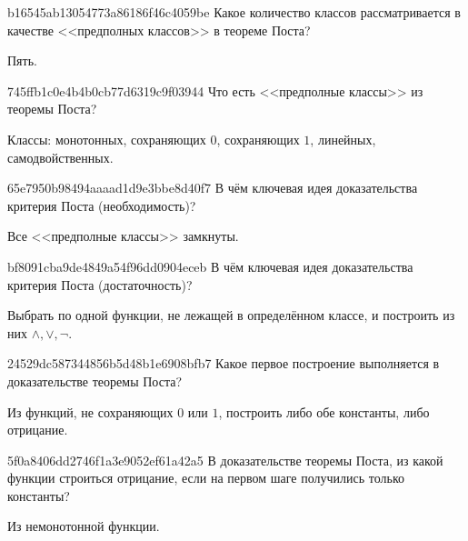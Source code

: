 \begin{note}{b16545ab13054773a86186f46c4059be}
    Какое количество классов рассматривается в качестве  <<предполных классов>> в теореме Поста?

    \begin{cloze}{1}
        Пять.
    \end{cloze}
\end{note}

\begin{note}{745ffb1c0e4b4b0cb77d6319c9f03944}
    Что есть <<предполные классы>> из теоремы Поста?

    \begin{cloze}{1}
        Классы: монотонных, сохраняющих \({ 0 }\), сохраняющих \({ 1 }\), линейных, самодвойственных.
    \end{cloze}
\end{note}

\begin{note}{65e7950b98494aaaad1d9e3bbe8d40f7}
    В чём ключевая идея доказательства критерия Поста (необходимость)?

    \begin{cloze}{1}
        Все <<предполные классы>> замкнуты.
    \end{cloze}
\end{note}

\begin{note}{bf8091cba9de4849a54f96dd0904eceb}
    В чём ключевая идея доказательства критерия Поста (достаточность)?

    \begin{cloze}{1}
        Выбрать по одной функции, не лежащей в определённом классе, и построить из них \({ \land, \lor, \lnot }\).
    \end{cloze}
\end{note}

\begin{note}{24529dc587344856b5d48b1e6908bfb7}
    Какое первое построение выполняется в доказательстве теоремы Поста?

    \begin{cloze}{1}
        Из функций, не сохраняющих \({ 0 }\) или \({ 1 }\), построить либо обе константы, либо отрицание.
    \end{cloze}
\end{note}

\begin{note}{5f0a8406dd2746f1a3e9052ef61a42a5}
    В доказательстве теоремы Поста, из какой функции строиться отрицание, если на первом шаге получились только константы?

    \begin{cloze}{1}
        Из немонотонной функции.
    \end{cloze}
\end{note}

